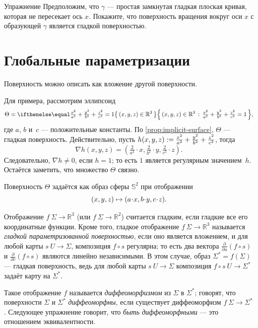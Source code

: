 \begin{thm}{Упражнение}\label{ex:revolution}
Предположим, что $\gamma$ --- простая замкнутая гладкая плоская кривая, которая не пересекает ось $x$.
Покажите, что поверхность вращения вокруг оси $x$ с образующей $\gamma$ является гладкой поверхностью.
\end{thm}

\section{Глобальные параметризации}\label{sec:global-parametrizations}

Поверхность можно описать как вложение другой поверхности.

Для примера, рассмотрим эллипсоид
\[\Theta=\set{(x,y,z)\in\mathbb{R}^3}{\tfrac{x^2}{a^2}+\tfrac{y^2}{b^2}+\tfrac{z^2}{c^2}=1},\]
где $a$, $b$ и~$c$ --- положительные константы.
По \ref{prop:implicit-surface}, $\Theta$ --- гладкая поверхность.
Действительно, пусть $h(x,y,z)\mathrel{:=}\tfrac{x^2}{a^2}+\tfrac{y^2}{b^2}+\tfrac{z^2}{c^2}$,
тогда
\[\nabla h(x,y,z)=(\tfrac{2}{a^2}\cdot x,\tfrac{2}{b^2}\cdot y,\tfrac{2}{c^2}\cdot z).\]
Следовательно, $\nabla h\ne0$, если $h=1$; то есть $1$ является регулярным значением~$h$.
Остаётся заметить, что множество $\Theta$ связно.

Поверхность $\Theta$ задаётся как образ сферы $\mathbb{S}^2$ при отображении
\[(x,y,z)\z\mapsto (a\cdot x, b\cdot y,c\cdot z).\]

Отображение $f\:\Sigma \to \mathbb{R}^3$ (или $f\:\Sigma \to \mathbb{R}^2$) считается гладким, если гладкие все его координатные функции.
Кроме того, гладкое отображение $f \: \Sigma \to \mathbb{R}^3$ называется 
\emph{гладкой параметризованной поверхностью}, если оно является вложением, и для любой карты $s \:U\to \Sigma$,
композиция $f\circ s$ регулярна;
то есть два вектора 
$\frac{\partial}{\partial u}(f\circ s)$ и $\frac{\partial}{\partial v}(f\circ s)$ являются линейно независимыми.
В этом случае, образ $\Sigma^{*}=f(\Sigma)$ --- гладкая поверхность, ведь для любой карты $s\:U\to \Sigma$ композиция $f\circ s\:U\to \Sigma^{*}$ задаёт карту на $\Sigma^{*}$. 

Такое отображение $f$ называется \emph{диффеоморфизмом} из $\Sigma$ в $\Sigma^{*}$;
говорят, что поверхности $\Sigma$ и $\Sigma^{*}$ {}\emph{диффеоморфны}, если существует диффеоморфизм $f\:\Sigma\to\Sigma^{*}$.
Следующее упражнение говорит, что \textit{быть диффеоморфными} --- это отношением эквивалентности.

